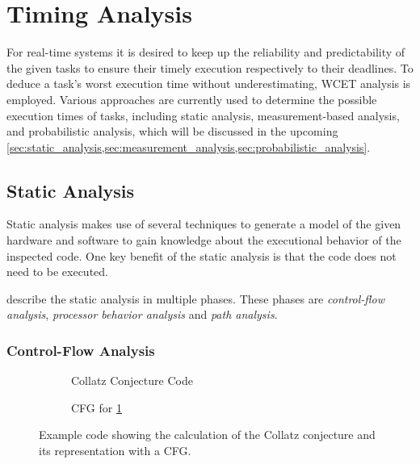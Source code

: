 \section{Timing Analysis}\label{sec:timing_analysis}
For real-time systems it is desired to keep up the reliability and predictability of the given tasks to ensure their timely execution respectively to their deadlines.
To deduce a task's worst execution time without underestimating, \ac{WCET} analysis is employed.
Various approaches are currently used to determine the possible execution times of tasks, including static analysis, measurement-based analysis, and probabilistic analysis, which will be discussed in the upcoming \cref{sec:static_analysis,sec:measurement_analysis,sec:probabilistic_analysis}.

\subsection{Static Analysis}\label{sec:static_analysis}
Static analysis makes use of several techniques to generate a model of the given hardware and software to gain knowledge about the executional behavior of the inspected code.
One key benefit of the static analysis is that the code does not need to be executed.

\textcite{wilhelmWorstcaseExecutiontimeProblem2008} describe the static analysis in multiple phases.
These phases are \textit{control-flow analysis}, \textit{processor behavior analysis} and \textit{path analysis}.

\subsubsection{Control-Flow Analysis}\label{sec:cfa}

\begin{figure}[h]
	\begin{subfigure}[c]{0.45\textwidth}
		
		\caption{Collatz Conjecture Code}
		\label{fig:collatz_code}
	\end{subfigure}
	\hfill
	\begin{subfigure}[c]{0.45\textwidth}
		
		\caption{\ac{CFG} for \cref{fig:collatz_code}}
		\label{fig:cfg}
	\end{subfigure}
	\caption{Example code showing the calculation of the Collatz conjecture and its representation with a \ac{CFG}.}
	\label{fig:collatz_and_cfg}
\end{figure}

